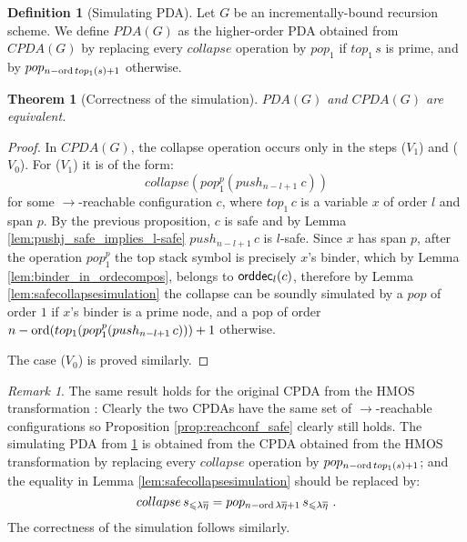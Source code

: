 \documentclass[a4paper,draft]{article}[12pt]
\newtheorem{theorem}{Theorem}[section]
\theoremstyle{remark}
\newtheorem{remark}{Remark}[section]
\theoremstyle{definition}
\newtheorem{definition}{Definition}[section]
\newcommand\orddec{{\sf orddec}}
\begin{document}
\begin{definition}[Simulating PDA]
\label{simulating_pda}
Let $G$ be an incrementally-bound recursion scheme.
We define $PDA(G)$ as the higher-order PDA obtained from
$CPDA(G)$ by replacing every $collapse$ operation by $pop_1$ if $top_1\, s$ is prime, and by $pop_{n-\mathop{\mathrm{ord}}{top_1(s)}+1}$ otherwise.
\end{definition}


\begin{theorem}[Correctness of the simulation]
$PDA(G)$ and $CPDA(G)$ are equivalent.
\end{theorem}
\begin{proof}
In $CPDA(G)$, the collapse operation occurs only in the steps ($V_1$) and ($V_0$). For ($V_1$) it is of the form:
$$collapse(pop_1^p(push_{n-l+1}~c))$$
for some $\rightarrow$-reachable configuration $c$, where $top_1\,c$ is a variable $x$ of order $l$ and span $p$.
By the previous proposition, $c$ is safe and by Lemma \ref{lem:pushj_safe_implies_l-safe} $push_{n-l+1}\, c$ is $l$-safe. Since $x$ has span $p$, after the operation $pop_1^p$ the top stack symbol is precisely $x$'s binder, which by Lemma \ref{lem:binder_in_ordecompos}, belongs to $\orddec_l(c)$, therefore
by Lemma \ref{lem:safecollapsesimulation} the collapse can be soundly simulated by a $pop$ of order
$1$ if $x$'s binder is a prime node, and a pop of order $n-\mathop{\mathrm{ord}}(top_1(pop_1^p(push_{n-l+1}\,c))) +1$ otherwise.

The case ($V_0$) is proved similarly.
\end{proof}

\begin{remark}
The same result holds for the original CPDA from the HMOS transformation \cite{hmos-lics08}:
Clearly the two CPDAs have the same set of $\rightarrow$-reachable configurations
so Proposition \ref{prop:reachconf_safe} clearly still holds.
The simulating PDA from \ref{simulating_pda} is obtained from
the CPDA obtained from the HMOS transformation by replacing every $collapse$ operation by $pop_{n-\mathop{\mathrm{ord}}{top_1(s)}+1}$;
and the equality in Lemma \ref{lem:safecollapsesimulation} should be replaced by:
$$collapse\,s_{\leqslant\lambda\overline\eta} = pop_{n-\mathop{\mathrm{ord}} \lambda\overline\eta +1}\,s_{\leqslant\lambda\overline\eta} \ .$$
The correctness of the simulation follows similarly.
\end{remark}
\end{document}

